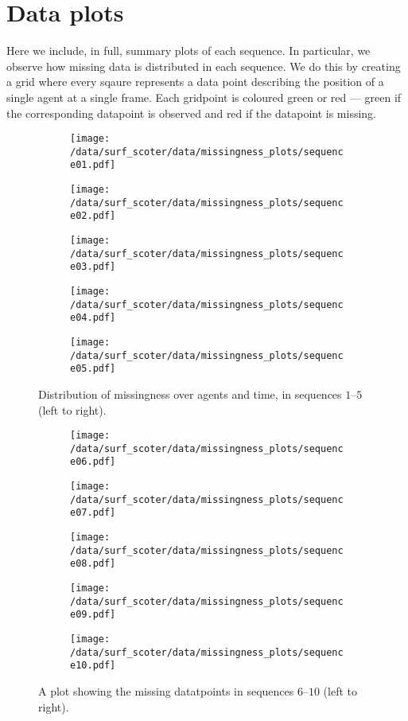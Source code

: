 \chapter{Data plots}
\label{cha:data_plots}

Here we include, in full, summary plots of each sequence. In particular, we observe how missing data is distributed in each sequence. We do this by creating a grid where every sqaure represents a data point describing the position of a single agent at a single frame. Each gridpoint is coloured green or red --- green if the corresponding datapoint is observed and red if the datapoint is missing.

\begin{figure}[h]
	\begin{subfigure}[b]{0.2\textwidth}
		\texttt{[image: /data/surf\_scoter/data/missingness\_plots/sequence01.pdf]}
	\end{subfigure}%
	\begin{subfigure}[b]{0.2\textwidth}
		\texttt{[image: /data/surf\_scoter/data/missingness\_plots/sequence02.pdf]}
	\end{subfigure}%
	\begin{subfigure}[b]{0.2\textwidth}
		\texttt{[image: /data/surf\_scoter/data/missingness\_plots/sequence03.pdf]}
	\end{subfigure}%
	\begin{subfigure}[b]{0.2\textwidth}
		\texttt{[image: /data/surf\_scoter/data/missingness\_plots/sequence04.pdf]}
	\end{subfigure}%
	\begin{subfigure}[b]{0.2\textwidth}
		\texttt{[image: /data/surf\_scoter/data/missingness\_plots/sequence05.pdf]}
	\end{subfigure}%
	\caption{Distribution of missingness over agents and time, in sequences $1$--$5$ (left to right).}
\end{figure}

\begin{figure}[t]
	\begin{subfigure}[b]{0.2\textwidth}
		\texttt{[image: /data/surf\_scoter/data/missingness\_plots/sequence06.pdf]}
	\end{subfigure}%
	\begin{subfigure}[b]{0.2\textwidth}
		\texttt{[image: /data/surf\_scoter/data/missingness\_plots/sequence07.pdf]}
	\end{subfigure}%
	\begin{subfigure}[b]{0.2\textwidth}
		\texttt{[image: /data/surf\_scoter/data/missingness\_plots/sequence08.pdf]}
	\end{subfigure}%
	\begin{subfigure}[b]{0.2\textwidth}
		\texttt{[image: /data/surf\_scoter/data/missingness\_plots/sequence09.pdf]}
	\end{subfigure}%
	\begin{subfigure}[b]{0.2\textwidth}
		\texttt{[image: /data/surf\_scoter/data/missingness\_plots/sequence10.pdf]}
	\end{subfigure}%
	\caption{A plot showing the missing datatpoints in sequences $6$--$10$ (left to right).}
\end{figure}

